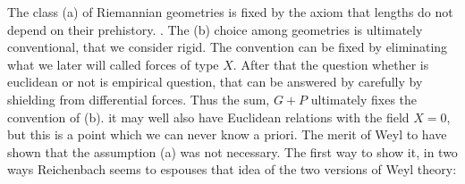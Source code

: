 \documentclass[draft]{article}
\begin{document}

The class (a) of Riemannian geometries is fixed by the axiom that lengths do not depend on their prehistory. . The (b) choice among geometries is ultimately conventional, that we consider rigid. The convention can be fixed by eliminating what we later will called forces of type $X$. After that the question whether is euclidean or not is empirical question, that can be answered by carefully by shielding from differential forces. Thus the sum, $G+P$ ultimately fixes the convention of (b). it may well also have Euclidean relations with the field $X = 0$, but this is a point which we can never know a priori. The merit of Weyl to have shown that the assumption (a) was not necessary. The first way to show it, in two ways Reichenbach seems to espouses that idea of the two versions of Weyl theory:
\end{document}
